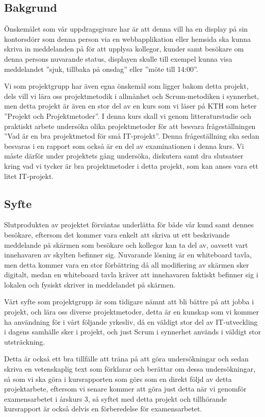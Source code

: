 \documentclass[11pt]{article}
\begin{document}
\subsection{Bakgrund}
\label{sec:orgfd8ef3a}
Önskemålet som vår uppdragsgivare har är att denna vill ha en display på
sin kontorsdörr som denna person via en webbapplikation eller hemsida
ska kunna skriva in meddelanden på för att upplysa kollegor, kunder samt
besökare om denna persons nuvarande status, displayen skulle till
exempel kunna visa meddelandet ”sjuk, tillbaka på onsdag” eller ”möte
till 14:00”.

Vi som projektgrupp har även egna önskemål som ligger bakom detta
projekt, dels vill vi lära oss projektmetodik i allmänhet och
Scrum-metodiken i synnerhet, men detta projekt är även en stor del av en
kurs som vi läser på KTH som heter ”Projekt och Projektmetoder”. I denna
kurs skall vi genom litteraturstudie och praktiskt arbete undersöka
olika projektmetoder för att besvara frågeställningen ”Vad är en bra
projektmetod för små IT-projekt”. Denna frågeställning ska sedan
besvaras i en rapport som också är en del av examinationen i denna kurs.
Vi måste därför under projektets gång undersöka, diskutera samt dra
slutsatser kring vad vi tycker är bra projektmetoder i detta projekt,
som kan anses vara ett litet IT-projekt.

\subsection{Syfte}
\label{sec:orgf793aef}
Slutprodukten av projektet förväntas underlätta för både vår kund samt
dennes besökare, eftersom det kommer vara enkelt att skriva ut ett
beskrivande meddelande på skärmen som besökare och kollegor kan ta del
av, oavsett vart innehavaren av skylten befinner sig. Nuvarande lösning
är en whiteboard tavla, men detta kommer vara en stor förbättring då all
modifiering av skärmen sker digitalt, medan en whiteboard tavla kräver
att innehavaren faktiskt befinner sig i lokalen och fysiskt skriver in
meddelandet på skärmen.

Vårt syfte som projektgrupp är som tidigare nämnt att bli bättre på att
jobba i projekt, och lära oss diverse projektmetoder, detta är en
kunskap som vi kommer ha användning för i vårt följande yrkesliv, då en
väldigt stor del av IT-utveckling i dagens samhälle sker i projekt, och
just Scrum i synnerhet används i väldigt stor utsträckning.

Detta är också ett bra tillfälle att träna på att göra undersökningar
och sedan skriva en vetenskaplig text som förklarar och berättar om
dessa undersökningar, så som vi ska göra i kursrapporten som görs som en
direkt följd av detta projektarbete, eftersom vi senare kommer att göra
just detta när vi genomför examensarbetet i årskurs 3, så syftet med
detta projekt och tillhörande kursrapport är också delvis en
förberedelse för examensarbetet.
\end{document}
